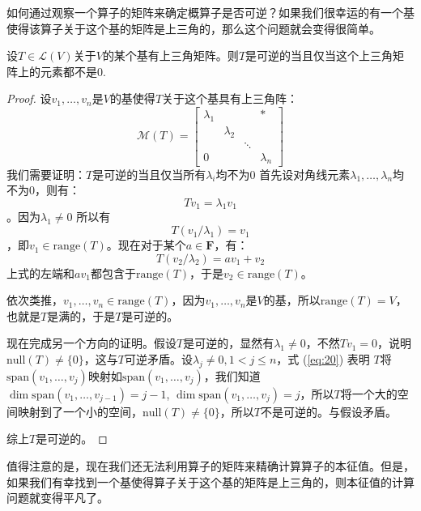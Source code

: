 \documentclass[10pt,a4paper,UTF8]{article}
\begin{document}
如何通过观察一个算子的矩阵来确定概算子是否可逆？如果我们很幸运的有一个基使得该算子关于这个基的矩阵是上三角的，那么这个问题就会变得很简单。

\begin{theorem}
设\(T\in \mathcal{L}(V)\)关于\(V\)的某个基有上三角矩阵。则\(T\)是可逆的当且仅当这个上三角矩阵上的元素都不是0.
\end{theorem}

\begin{proof}
设\(v_{1},\ldots ,v_{n}\)是\(V\)的基使得\(T\)关于这个基具有上三角阵：
\begin{equation}
\label{eq:20}
 \mathcal{M}(T) =

\begin{bmatrix}
\lambda_{1} & & & * \\
            &\lambda_{2} & &  \\
& &\ddots & \\
0& &       & \lambda_{n}
\end{bmatrix}
\end{equation}
我们需要证明：\(T\)是可逆的当且仅当所有\(\lambda_{i}\)均不为\(0\)
首先设对角线元素\(\lambda_{1},\ldots ,\lambda_{n}\)均不为\(0\)，则有：\[Tv_{1} = \lambda_{1} v_{1}\]。因为\(\lambda_{1}\neq 0\) 所以有\[T(v_{1}/\lambda_{1}) = v_{1}\]，即\(v_{1}\in \mathrm{range}(T)\)。现在对于某个\(a\in \mathbf{F}\)，有：\[T(v_{2}/\lambda_{2}) = av_{1} + v_{2}\]
上式的左端和\(av_{1}\)都包含于\(\mathrm{range}(T)\)，于是\(v_{2}\in \mathrm{range}(T)\)。

依次类推，\(v_{1},\ldots ,v_{n}\in \mathrm{range}(T)\)，因为\(v_{1},\ldots ,v_{n}\)是\(V\)的基，所以\(\mathrm{range}(T) = V\)，也就是\(T\)是满的，于是\(T\)是可逆的。

现在完成另一个方向的证明。假设\(T\)是可逆的，显然有\(\lambda_{1}\neq 0\)，不然\(Tv_{1} = 0\)，说明\(\mathrm{null}(T) \neq \{0\}\)，这与\(T\)可逆矛盾。设\(\lambda_{j}\neq 0, 1 < j \leq n\)，式 (\ref{eq:20})
表明 \(T\)将\(\mathrm{span}(v_{1},\ldots ,v_{j})\)映射如\(\mathrm{span}(v_{1},\ldots ,v_{j})\)，我们知道\(\dim \mathrm{span}(v_{1},\ldots ,v_{j-1}) = j-1\), \(\dim \mathrm{span}(v_{1},\ldots ,v_{j}) = j\)，所以\(T\)将一个大的空间映射到了一个小的空间，\(\mathrm{null}(T)\neq \{0\}\)，所以\(T\)不是可逆的。与假设矛盾。

综上\(T\)是可逆的。
\end{proof}

值得注意的是，现在我们还无法利用算子的矩阵来精确计算算子的本征值。但是，如果我们有幸找到一个基使得算子关于这个基的矩阵是上三角的，则本征值的计算问题就变得平凡了。
\end{document}
